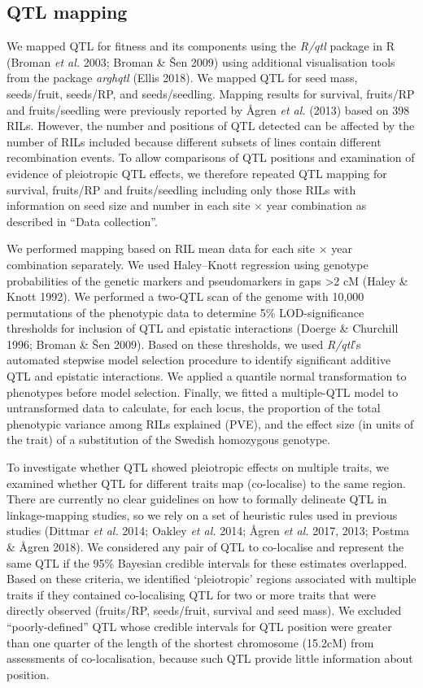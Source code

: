 \documentclass[
]{article}
\begin{document}
\hypertarget{qtl-mapping}{%
\subsection{QTL mapping}\label{qtl-mapping}}

We mapped QTL for fitness and its components using the \emph{R/qtl} package in R (Broman \emph{et al.} 2003; Broman \& Šen 2009) using additional visualisation tools from the package \emph{arghqtl} (Ellis 2018). We mapped QTL for seed mass, seeds/fruit, seeds/RP, and seeds/seedling. Mapping results for survival, fruits/RP and fruits/seedling were previously reported by Ågren \emph{et al.} (2013) based on 398 RILs. However, the number and positions of QTL detected can be affected by the number of RILs included because different subsets of lines contain different recombination events. To allow comparisons of QTL positions and examination of evidence of pleiotropic QTL effects, we therefore repeated QTL mapping for survival, fruits/RP and fruits/seedling including only those RILs with information on seed size and number in each site × year combination as described in ``Data collection''.

We performed mapping based on RIL mean data for each site × year combination separately. We used Haley--Knott regression using genotype probabilities of the genetic markers and pseudomarkers in gaps \textgreater2 cM (Haley \& Knott 1992). We performed a two-QTL scan of the genome with 10,000 permutations of the phenotypic data to determine 5\% LOD-significance thresholds for inclusion of QTL and epistatic interactions (Doerge \& Churchill 1996; Broman \& Šen 2009). Based on these thresholds, we used \emph{R/qtl}'s automated stepwise model selection procedure to identify significant additive QTL and epistatic interactions. We applied a quantile normal transformation to phenotypes before model selection. Finally, we fitted a multiple-QTL model to untransformed data to calculate, for each locus, the proportion of the total phenotypic variance among RILs explained (PVE), and the effect size (in units of the trait) of a substitution of the Swedish homozygous genotype.

To investigate whether QTL showed pleiotropic effects on multiple traits, we examined whether QTL for different traits map (co-localise) to the same region. There are currently no clear guidelines on how to formally delineate QTL in linkage-mapping studies, so we rely on a set of heuristic rules used in previous studies (Dittmar \emph{et al.} 2014; Oakley \emph{et al.} 2014; Ågren \emph{et al.} 2017, 2013; Postma \& Ågren 2018). We considered any pair of QTL to co-localise and represent the same QTL if the 95\% Bayesian credible intervals for these estimates overlapped. Based on these criteria, we identified `pleiotropic' regions associated with multiple traits if they contained co-localising QTL for two or more traits that were directly observed (fruits/RP, seeds/fruit, survival and seed mass). We excluded ``poorly-defined'' QTL whose credible intervals for QTL position were greater than one quarter of the length of the shortest chromosome (15.2cM) from assessments of co-localisation, because such QTL provide little information about position.
\end{document}
